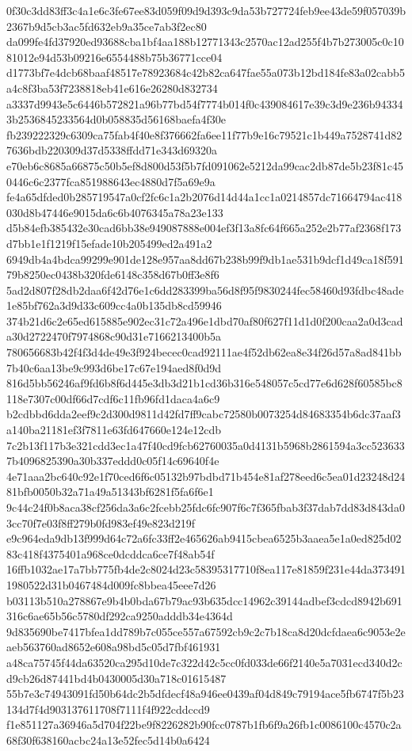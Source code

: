 \documentclass[11pt,a4paper]{article}
\begin{document}
{0f30c3dd83ff3c4a1e6c3fe67ee83d059f09d9d393c9da53b727724feb9ee43de59f057039b2367b9d5cb3ac5fd632eb9a35ce7ab3f2ec80
da099fe4fd37920ed93688cba1bf4aa188b12771343c2570ac12ad255f4b7b273005c0c1081012e94d53b09216e6554488b75b36771cce04
d1773bf7e4dcb68baaf48517e78923684c42b82ca647fae55a073b12bd184fe83a02cabb5a4c8f3ba53f7238818eb41e616e26280d832734
a3337d9943e5c6446b572821a96b77bd54f7774b014f0c439084617e39c3d9e236b943343b2536845233564d0b058835d56168baefa4f30e
fb239222329c6309ca75fab4f40e8f376662fa6ee11f77b9e16c79521c1b449a7528741d827636bdb220309d37d5338ffdd71e343d69320a
e70eb6c8685a66875c50b5ef8d800d53f5b7fd091062e5212da99cac2db87de5b23f81c450446c6c2377fca851988643ec4880d7f5a69e9a
fe4a65dfded0b285719547a0cf2fc6c1a2b2076d14d44a1cc1a0214857dc71664794ac418030d8b47446e9015da6c6b4076345a78a23e133
d5b84efb385432e30cad6bb38e949087888e004ef3f13a8fc64f665a252e2b77af2368f173d7bb1e1f1219f15efade10b205499ed2a491a2
6949db4a4bdca99299e901de128e957aa8dd67b238b99f9db1ae531b9dcf1d49ca18f59179b8250ec0438b320fde6148c358d67b0ff3e8f6
5ad2d807f28db2daa6f42d76e1c6dd283399ba56d8f95f9830244fec58460d93fdbc48ade1e85bf762a3d9d33c609cc4a0b135db8cd59946
374b21d6c2e65ed615885e902ec31c72a496e1dbd70af80f627f11d1d0f200caa2a0d3cada30d2722470f7974868c90d31e7166213400b5a
780656683b42f4f3d4de49e3f924becec0cad92111ae4f52db62ea8e34f26d57a8ad841bb7b40c6aa13be9c993d6be17c67e194aed8f0d9d
816d5bb56246af9fd6b8f6d445e3db3d21b1cd36b316e548057c5cd77e6d628f60585bc8118e7307c00df66d7cdf6c11fb96fd1daca4a6c9
b2cdbbd6dda2eef9c2d300d9811d42fd7ff9cabc72580b0073254d84683354b6dc37aaf3a140ba21181ef3f7811e63fd647660e124e12cdb
7c2b13f117b3e321cdd3ec1a47f40cd9fcb62760035a0d4131b5968b2861594a3cc5236337b4096825390a30b337eddd0c05f14c69640f4e
4e71aaa2bc640c92e1f70ced6f6c05132b97bdbd71b454e81af278eed6c5ea01d23248d2481bfb0050b32a71a49a51343bf6281f5fa6f6e1
9c44c24f0b8aca38cf256da3a6c2fcebb25fdc6fc907f6c7f365fbab3f37dab7dd83d843da03cc70f7e03f8ff279b0fd983ef49e823d219f
e9c964eda9db13f999d64c72a6fc33ff2e465626ab9415cbea6525b3aaea5e1a0ed825d0283c418f4375401a968ce0dcddca6ce7f48ab54f
16ffb1032ae17a7bb775fb4de2c8024d23c58395317710f8ea117e81859f231e44da3734911980522d31b0467484d009fc8bbea45eee7d26
b03113b510a278867e9b4b0bda67b79ac93b635dcc14962c39144adbef3cdcd8942b691316c6ae65b56c5780df292ca9250adddb34e4364d
9d835690be7417bfea1dd789b7c055ce557a67592cb9c2c7b18ca8d20dcfdaea6c9053e2eaeb563760ad8652e608a98bd5c05d7fbf461931
a48ca75745f44da63520ca295d10de7c322d42c5cc0fd033de66f2140e5a7031ecd340d2cd9cb26d87441bd4b0430005d30a718c01615487
55b7e3c74943091fd50b64dc2b5dfdecf48a946ee0439af04d849c79194ace5fb6747f5b23134d7f4d903137611708f7111f4f922cddccd9
f1e851127a36946a5d704f22be9f8226282b90fcc0787b1fb6f9a26fb1c0086100c4570c2a68f30f638160acbc24a13e52fec5d14b0a6424
}
\end{document}
